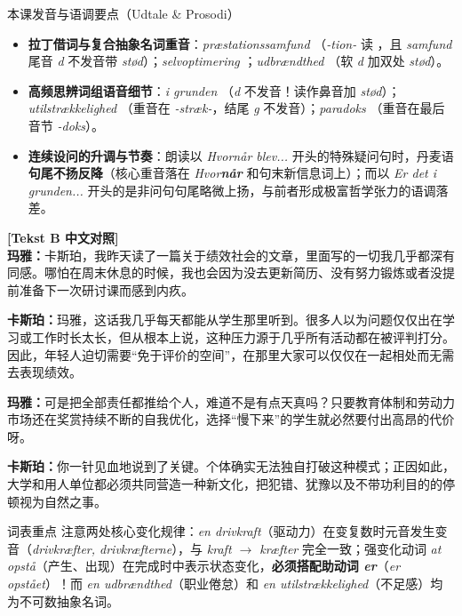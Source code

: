 \begin{tipbox}{本课发音与语调要点（Udtale \& Prosodi）}
\begin{itemize}
  \item \textbf{拉丁借词与复合抽象名词重音}：\textit{præstationssamfund} （\textit{-tion-} 读 ，且 \textit{samfund} 尾音 \textit{d} 不发音带 \textit{stød}）；\textit{selvoptimering} ；\textit{udbrændthed} （软 \textit{d} 加双处 \textit{stød}）。
  \item \textbf{高频思辨词组语音细节}：\textit{i grunden} （\textit{d} 不发音！读作鼻音加 \textit{stød}）；\textit{utilstrækkelighed} （重音在 \textit{-stræk-}，结尾 \textit{g} 不发音）；\textit{paradoks} （重音在最后音节 \textit{-doks}）。
  \item \textbf{连续设问的升调与节奏}：朗读以 \textit{Hvornår blev...} 开头的特殊疑问句时，丹麦语\textbf{句尾不扬反降}（核心重音落在 \textit{Hvor\textbf{når}} 和句末新信息词上）；而以 \textit{Er det i grunden...} 开头的是非问句句尾略微上扬，与前者形成极富哲学张力的语调落差。
\end{itemize}
\end{tipbox}

\begin{transbox}
\small
\textbf{\color{NCDTeal}[Tekst B 中文对照]}\\
\textbf{玛雅：}卡斯珀，我昨天读了一篇关于绩效社会的文章，里面写的一切我几乎都深有同感。哪怕在周末休息的时候，我也会因为没去更新简历、没有努力锻炼或者没提前准备下一次研讨课而感到内疚。

\textbf{卡斯珀：}玛雅，这话我几乎每天都能从学生那里听到。很多人以为问题仅仅出在学习或工作时长太长，但从根本上说，这种压力源于几乎所有活动都在被评判打分。因此，年轻人迫切需要“免于评价的空间”，在那里大家可以仅仅在一起相处而无需去表现绩效。

\textbf{玛雅：}可是把全部责任都推给个人，难道不是有点天真吗？只要教育体制和劳动力市场还在奖赏持续不断的自我优化，选择“慢下来”的学生就必然要付出高昂的代价呀。

\textbf{卡斯珀：}你一针见血地说到了关键。个体确实无法独自打破这种模式；正因如此，大学和用人单位都必须共同营造一种新文化，把犯错、犹豫以及不带功利目的的停顿视为自然之事。
\end{transbox}


\begin{tipbox}{词表重点}
注意两处核心变化规律：\textit{en drivkraft}（驱动力）在变复数时元音发生变音（\textit{drivkræfter, drivkræfterne}），与 \textit{kraft $\rightarrow$ kræfter} 完全一致；强变化动词 \textit{at opstå}（产生、出现）在完成时中表示状态变化，\textbf{必须搭配助动词 \textit{er}}（\textit{er opstået}）！而 \textit{en udbrændthed}（职业倦怠）和 \textit{en utilstrækkelighed}（不足感）均为不可数抽象名词。
\end{tipbox}

